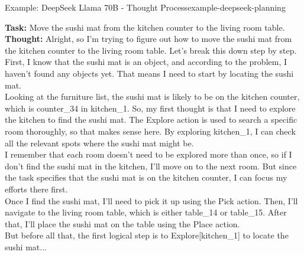 \begin{Example}{Example: DeepSeek Llama 70B - Thought Process}{example-deepseek-planning}

    \textbf{Task:} Move the sushi mat from the kitchen counter to the living room table. \\

    \textbf{Thought:} Alright, so I'm trying to figure out how to move the sushi mat from the kitchen counter to the living room table. Let's break this down step by step. First, I know that the sushi mat is an object, and according to the problem, I haven't found any objects yet. That means I need to start by locating the sushi mat. \\

    Looking at the furniture list, the sushi mat is likely to be on the kitchen counter, which is counter\_34 in kitchen\_1. So, my first thought is that I need to explore the kitchen to find the sushi mat. The Explore action is used to search a specific room thoroughly, so that makes sense here. By exploring kitchen\_1, I can check all the relevant spots where the sushi mat might be. \\

    I remember that each room doesn't need to be explored more than once, so if I don't find the sushi mat in the kitchen, I'll move on to the next room. But since the task specifies that the sushi mat is on the kitchen counter, I can focus my efforts there first. \\

    Once I find the sushi mat, I'll need to pick it up using the Pick action. Then, I'll navigate to the living room table, which is either table\_14 or table\_15. After that, I'll place the sushi mat on the table using the Place action. \\

    But before all that, the first logical step is to Explore[kitchen\_1] to locate the sushi mat...

\end{Example}\label{ex:deepseek-planning}

